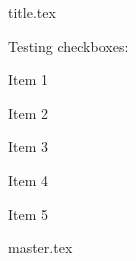 \documentclass[a4paper, 12pt]{article}
\begin{document}
{title.tex}





\setcounter{tocdepth}{3} %

\tableofcontents

\newpage

\listoffigures

\listoftables


\newpage

\printglossary[type=acronym]

Testing checkboxes:
\begin{todolist}
    \item Item 1
    \item [\done] Item 2
    \item [\wontfix] Item 3
    \item [\cmark] Item 4
    \item [\xmark] Item 5
\end{todolist}


\newpage

\newpage




\newpage

{master.tex}

\newpage


\newpage



\newpage





\end{document}
